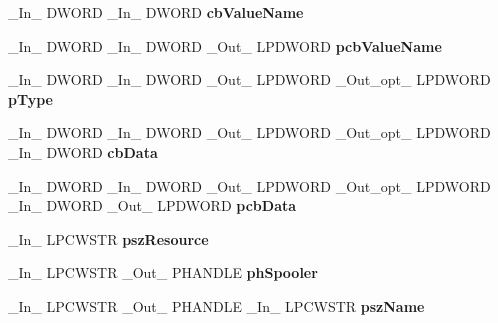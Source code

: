 \begin{DoxyCompactItemize}
\+\_\+\+In\+\_\+ D\+W\+O\+RD \+\_\+\+In\+\_\+ D\+W\+O\+RD {\bfseries cb\+Value\+Name}
\item 
\mbox{\label{struct___p_r_i_n_t_p_r_o_v_i_d_o_r_ab7eb97f17835a282abf2ebc2f0463945}} 
\+\_\+\+In\+\_\+ D\+W\+O\+RD \+\_\+\+In\+\_\+ D\+W\+O\+RD \+\_\+\+Out\+\_\+ L\+P\+D\+W\+O\+RD {\bfseries pcb\+Value\+Name}
\item 
\mbox{\label{struct___p_r_i_n_t_p_r_o_v_i_d_o_r_a4ce1ee263f82b7e22c8d96e03fbe3197}} 
\+\_\+\+In\+\_\+ D\+W\+O\+RD \+\_\+\+In\+\_\+ D\+W\+O\+RD \+\_\+\+Out\+\_\+ L\+P\+D\+W\+O\+RD \+\_\+\+Out\+\_\+opt\+\_\+ L\+P\+D\+W\+O\+RD {\bfseries p\+Type}
\item 
\mbox{\label{struct___p_r_i_n_t_p_r_o_v_i_d_o_r_af62306bbf229ea986d8c37d790c36e81}} 
\+\_\+\+In\+\_\+ D\+W\+O\+RD \+\_\+\+In\+\_\+ D\+W\+O\+RD \+\_\+\+Out\+\_\+ L\+P\+D\+W\+O\+RD \+\_\+\+Out\+\_\+opt\+\_\+ L\+P\+D\+W\+O\+RD \+\_\+\+In\+\_\+ D\+W\+O\+RD {\bfseries cb\+Data}
\item 
\mbox{\label{struct___p_r_i_n_t_p_r_o_v_i_d_o_r_a082e9f6b18265c0562d0f23383530701}} 
\+\_\+\+In\+\_\+ D\+W\+O\+RD \+\_\+\+In\+\_\+ D\+W\+O\+RD \+\_\+\+Out\+\_\+ L\+P\+D\+W\+O\+RD \+\_\+\+Out\+\_\+opt\+\_\+ L\+P\+D\+W\+O\+RD \+\_\+\+In\+\_\+ D\+W\+O\+RD \+\_\+\+Out\+\_\+ L\+P\+D\+W\+O\+RD {\bfseries pcb\+Data}
\item 
\mbox{\label{struct___p_r_i_n_t_p_r_o_v_i_d_o_r_aab7453b794ea195c804078b4ccbcdf4e}} 
\+\_\+\+In\+\_\+ L\+P\+C\+W\+S\+TR {\bfseries psz\+Resource}
\item 
\mbox{\label{struct___p_r_i_n_t_p_r_o_v_i_d_o_r_a9ec78cb9077783b87c923c565d19fbac}} 
\+\_\+\+In\+\_\+ L\+P\+C\+W\+S\+TR \+\_\+\+Out\+\_\+ P\+H\+A\+N\+D\+LE {\bfseries ph\+Spooler}
\item 
\mbox{\label{struct___p_r_i_n_t_p_r_o_v_i_d_o_r_a1ee3d1ae2e618457c6c157a44c7fca50}} 
\+\_\+\+In\+\_\+ L\+P\+C\+W\+S\+TR \+\_\+\+Out\+\_\+ P\+H\+A\+N\+D\+LE \+\_\+\+In\+\_\+ L\+P\+C\+W\+S\+TR {\bfseries psz\+Name}
\item 

\end{DoxyCompactItemize}
